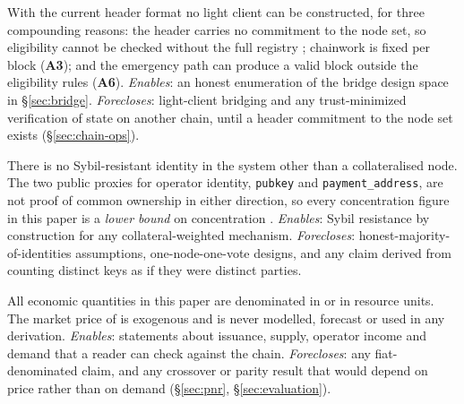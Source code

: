 \begin{assumption}
\label{asm:a9-lightclient}
\shipped With the current header format no \Flux{} light client can be constructed, for three
compounding reasons: the \PoN{} header carries no commitment to the node set, so eligibility cannot
be checked without the full registry ; chainwork
is fixed per block (\textbf{A3}); and the emergency path can produce a valid block outside the
eligibility rules (\textbf{A6}).
\emph{Enables}: an honest enumeration of the bridge design space in \S\ref{sec:bridge}.
\emph{Forecloses}: light-client bridging and any trust-minimized verification of \Flux{} state on
another chain, until a header commitment to the node set exists (\S\ref{sec:chain-ops}).
\end{assumption}

\begin{assumption}
\label{asm:a10-identity}
\shipped There is no Sybil-resistant identity in the system other than a collateralised node. The two public
proxies for operator identity, \texttt{pubkey} and \texttt{payment\_address}, are not proof of common
ownership in either direction, so every concentration figure in this paper is a \emph{lower bound} on
concentration .
\emph{Enables}: Sybil resistance by construction for any collateral-weighted mechanism.
\emph{Forecloses}: honest-majority-of-identities assumptions, one-node-one-vote designs, and any
claim derived from counting distinct keys as if they were distinct parties.
\end{assumption}

\begin{assumption}
\label{asm:a11-denomination}
All economic quantities in this paper are denominated in \flux{} or in resource units. The market
price of \flux{} is exogenous and is never modelled, forecast or used in any derivation.
\emph{Enables}: statements about issuance, supply, operator income and demand that a reader can check
against the chain. \emph{Forecloses}: any fiat-denominated claim, and any crossover or parity result
that would depend on price rather than on demand (\S\ref{sec:pnr}, \S\ref{sec:evaluation}).
\end{assumption}

